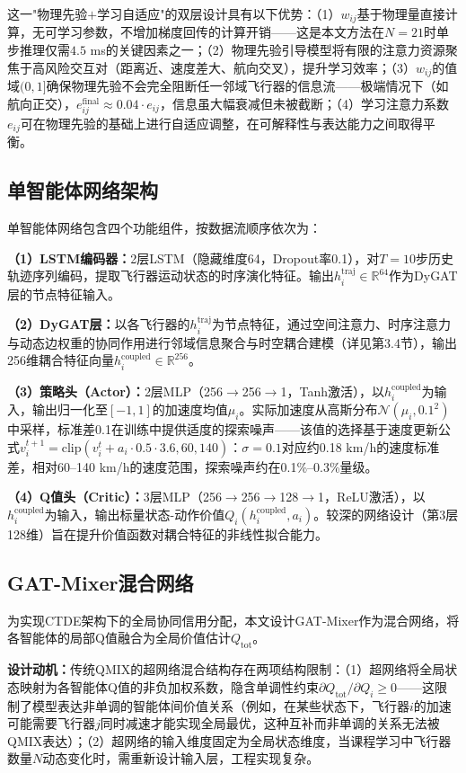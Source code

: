 \documentclass[12pt,a4paper,UTF8]{ctexart}
\begin{document}
这一"物理先验$+$学习自适应"的双层设计具有以下优势：（1）$w_{ij}$基于物理量直接计算，无可学习参数，不增加梯度回传的计算开销——这是本文方法在$N=21$时单步推理仅需$4.5$ ms的关键因素之一；（2）物理先验引导模型将有限的注意力资源聚焦于高风险交互对（距离近、速度差大、航向交叉），提升学习效率；（3）$w_{ij}$的值域$(0, 1]$确保物理先验不会完全阻断任一邻域飞行器的信息流——极端情况下（如航向正交），$e_{ij}^{\text{final}} \approx 0.04 \cdot e_{ij}$，信息虽大幅衰减但未被截断；（4）学习注意力系数$e_{ij}$可在物理先验的基础上进行自适应调整，在可解释性与表达能力之间取得平衡。

\subsection{单智能体网络架构}

单智能体网络包含四个功能组件，按数据流顺序依次为：

\textbf{（1）LSTM编码器：}2层LSTM（隐藏维度64，Dropout率0.1），对$T=10$步历史轨迹序列编码，提取飞行器运动状态的时序演化特征。输出$h_i^{\text{traj}} \in \mathbb{R}^{64}$作为DyGAT层的节点特征输入。

\textbf{（2）DyGAT层：}以各飞行器的$h_i^{\text{traj}}$为节点特征，通过空间注意力、时序注意力与动态边权重的协同作用进行邻域信息聚合与时空耦合建模（详见第3.4节），输出256维耦合特征向量$h_i^{\text{coupled}} \in \mathbb{R}^{256}$。

\textbf{（3）策略头（Actor）：}2层MLP（256$\to$256$\to$1，Tanh激活），以$h_i^{\text{coupled}}$为输入，输出归一化至$[-1, 1]$的加速度均值$\mu_i$。实际加速度从高斯分布$\mathcal{N}(\mu_i, 0.1^2)$中采样，标准差0.1在训练中提供适度的探索噪声——该值的选择基于速度更新公式$v_i^{t+1} = \text{clip}(v_i^t + a_i \cdot 0.5 \cdot 3.6, 60, 140)$：$\sigma=0.1$对应约0.18 km/h的速度标准差，相对60--140 km/h的速度范围，探索噪声约在0.1\%--0.3\%量级。

\textbf{（4）Q值头（Critic）：}3层MLP（256$\to$256$\to$128$\to$1，ReLU激活），以$h_i^{\text{coupled}}$为输入，输出标量状态-动作价值$Q_i(h_i^{\text{coupled}}, a_i)$。较深的网络设计（第3层128维）旨在提升价值函数对耦合特征的非线性拟合能力。

\subsection{GAT-Mixer混合网络}

为实现CTDE架构下的全局协同信用分配，本文设计GAT-Mixer作为混合网络，将各智能体的局部Q值融合为全局价值估计$Q_{\text{tot}}$。

\textbf{设计动机：}传统QMIX的超网络混合结构\cite{ref11}存在两项结构限制：（1）超网络将全局状态映射为各智能体Q值的非负加权系数，隐含单调性约束$\partial Q_{\text{tot}} / \partial Q_i \geq 0$——这限制了模型表达非单调的智能体间价值关系（例如，在某些状态下，飞行器$i$的加速可能需要飞行器$j$同时减速才能实现全局最优，这种互补而非单调的关系无法被QMIX表达）；（2）超网络的输入维度固定为全局状态维度，当课程学习中飞行器数量$N$动态变化时，需重新设计输入层，工程实现复杂。
\end{document}

